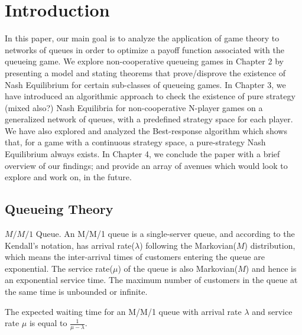 \chapter{Introduction}

In this paper, our main goal is to analyze the application of game theory to networks of queues in order to optimize a payoff function associated with the queueing game. We explore non-cooperative queueing games in Chapter 2 by presenting a model and stating theorems that prove/disprove the existence of Nash Equilibrium for certain sub-classes of queueing games.
In Chapter 3, we have introduced an algorithmic approach to check the existence of pure strategy (mixed also?) Nash Equilibria for non-cooperative N-player games on a generalized network of queues, with a predefined strategy space for each player. We have also explored and analyzed the Best-response algorithm which shows that, for a game with a continuous strategy space, a pure-strategy Nash Equilibrium always exists.
In Chapter 4, we conclude the paper with a brief overview of our findings; and provide an array of avenues which would look to explore and work on, in the future.



\section{Queueing Theory}

\begin{definition}\label{abc1}
$M/M/1$ Queue.
	An M/M/1 queue is a single-server queue, and according to the Kendall's notation, has arrival rate($\lambda$) following the Markovian($M$) distribution, which means the inter-arrival times of customers entering the queue are exponential. The service rate($\mu$) of the queue	is also Markovian($M$) and hence is an exponential service time. The maximum number of customers in the queue at the same time is unbounded or infinite.
\end{definition}
\vspace{2mm}
\begin{theorem}
The expected waiting time for an M/M/1 queue with arrival rate $\lambda$ and service rate $\mu$ is equal to $\frac{1}{\mu - \lambda}$.
\end{theorem}

